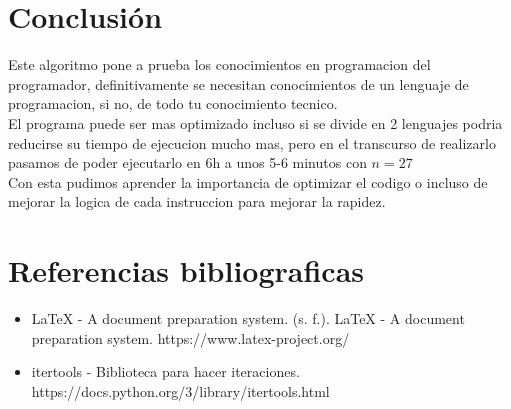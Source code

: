 \documentclass{article}
\begin{document}
\section{Conclusión}
Este algoritmo pone a prueba los conocimientos en programacion del programador, definitivamente se necesitan conocimientos de un lenguaje de programacion, si no, de todo tu conocimiento tecnico.
\\El programa puede ser mas optimizado incluso si se divide en 2 lenguajes podria reducirse su tiempo de ejecucion mucho mas, pero en el transcurso de realizarlo pasamos de poder ejecutarlo en 6h a unos 5-6 minutos con $n=27$
\\Con esta pudimos aprender la importancia de optimizar el codigo o incluso de mejorar la logica de cada instruccion para mejorar la rapidez.

\section{Referencias bibliograficas}
\begin{itemize}
    \item LaTeX - A document preparation system. (s. f.). LaTeX - A document preparation system. https://www.latex-project.org/
    \item itertools - Biblioteca para hacer iteraciones. https://docs.python.org/3/library/itertools.html
\end{itemize}
\end{document}
